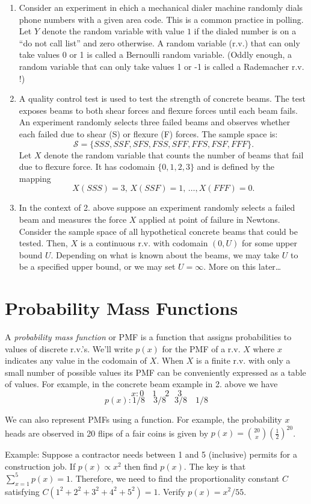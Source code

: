 \documentclass[]{book}
\begin{document}
\begin{enumerate}
\def\labelenumi{\arabic{enumi}.}
\item
  Consider an experiment in ehich a mechanical dialer machine randomly
  dials phone numbers with a given area code. This is a common practice
  in polling. Let \(Y\) denote the random variable with value \(1\) if
  the dialed number is on a ``do not call list'' and zero otherwise. A
  random variable (r.v.) that can only take values 0 or 1 is called a
  Bernoulli random variable. (Oddly enough, a random variable that can
  only take values 1 or -1 is called a Rademacher r.v. !)
\item
  A quality control test is used to test the strength of concrete beams.
  The test exposes beams to both shear forces and flexure forces until
  each beam fails. An experiment randomly selects three failed beams and
  observes whether each failed due to shear (S) or flexure (F) forces.
  The sample space is:
  \[\mathcal{S} = \{SSS, SSF, SFS, FSS, SFF, FFS, FSF, FFF\}.\] Let
  \(X\) denote the random variable that counts the number of beams that
  fail due to flexure force. It has codomain \(\{0,1,2,3\}\) and is
  defined by the mapping
  \[X(SSS) = 3, \, X(SSF) = 1, \, \ldots, X(FFF) = 0.\]
\item
  In the context of 2. above suppose an experiment randomly selects a
  failed beam and measures the force \(X\) applied at point of failure
  in Newtons. Consider the sample space of all hypothetical concrete
  beams that could be tested. Then, \(X\) is a continuous r.v. with
  codomain \((0,U)\) for some upper bound \(U\). Depending on what is
  known about the beams, we may take \(U\) to be a specified upper
  bound, or we may set \(U = \infty\). More on this later\ldots{}
\end{enumerate}

\section{Probability Mass Functions}\label{probability-mass-functions}

A \emph{probability mass function} or PMF is a function that assigns
probabilities to values of discrete r.v.'s. We'll write \(p(x)\) for the
PMF of a r.v. \(X\) where \(x\) indicates any value in the codomain of
\(X\). When \(X\) is a finite r.v. with only a small number of possible
values its PMF can be conveniently expressed as a table of values. For
example, in the concrete beam example in 2. above we have
\[x: 0 \quad 1\quad 2\quad 3\] \[p(x):1/8\quad 3/8\quad 3/8 \quad 1/8\]

We can also represent PMFs using a function. For example, the
probability \(x\) heads are observed in 20 flips of a fair coins is
given by \(p(x) = {20 \choose x}(\frac{1}{2})^{20}\).

Example: Suppose a contractor needs between 1 and 5 (inclusive) permits
for a construction job. If \(p(x)\propto x^2\) then find \(p(x)\). The
key is that \(\sum_{x=1}^5 p(x) = 1\). Therefore, we need to find the
proportionality constant \(C\) satisfying
\(C(1^2+2^2+3^2+4^2+5^2) = 1\). Verify \(p(x) = x^2 / 55\).


\end{document}
